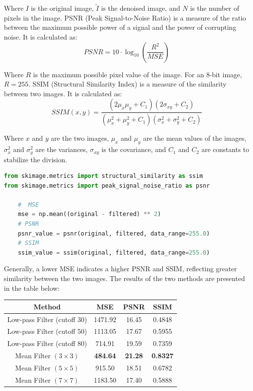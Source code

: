 \documentclass[12pt, a4paper, oneside]{ctexart}
\begin{document}
Where \(I\) is the original image, \(\tilde{I}\) is the denoised image, and \(N\) is the number of pixels in the image.	
PSNR (Peak Signal-to-Noise Ratio) is a measure of the ratio between the maximum possible power of a signal and the power of corrupting noise. It is calculated as:
\[PSNR = 10 \cdot \log_{10}\left(\frac{R^2}{MSE}\right)\]

Where \(R\) is the maximum possible pixel value of the image. For an 8-bit image, \(R = 255\).
SSIM (Structural Similarity Index) is a measure of the similarity between two images. It is calculated as:
\[SSIM(x, y) = \frac{(2\mu_x\mu_y + C_1)(2\sigma_{xy} + C_2)}{(\mu_x^2 + \mu_y^2 + C_1)(\sigma_x^2 + \sigma_y^2 + C_2)}\]

Where \(x\) and \(y\) are the two images, \(\mu_x\) and \(\mu_y\) are the mean values of the images, \(\sigma_x^2\) and \(\sigma_y^2\) are the variances, \(\sigma_{xy}\) is the covariance, and \(C_1\) and \(C_2\) are constants to stabilize the division.

\begin{lstlisting}[style=mystyle,language=Python]
from skimage.metrics import structural_similarity as ssim
from skimage.metrics import peak_signal_noise_ratio as psnr	

	#  MSE
	mse = np.mean((original - filtered) ** 2)
	# PSNR 
	psnr_value = psnr(original, filtered, data_range=255.0)
	# SSIM
    ssim_value = ssim(original, filtered, data_range=255.0)
\end{lstlisting}

Generally, a lower MSE indicates a higher PSNR and SSIM, reflecting greater similarity between the two images. The results of the two methods are presented in the table below:

\begin{table}[h]
	\centering
	\begin{tabular}{cccc}
		\toprule
		Method & MSE   & PSNR  & SSIM  \\ 
		\midrule
		Low-pass Filter (cutoff 30) & 1471.92 & 16.45 & 0.4848  \\ 
		Low-pass Filter (cutoff 50) & 1113.05 & 17.67 & 0.5955  \\ 
		Low-pass Filter (cutoff 80) & 714.91 & 19.59 & 0.7359  \\ 
		Mean Filter $(3\times3)$    & \textbf{484.64} & \textbf{21.28} & \textbf{0.8327}  \\ 
		Mean Filter $(5\times5)$    & 915.50 & 18.51 & 0.6782  \\ 
		Mean Filter $(7\times7)$    & 1183.50 & 17.40 & 0.5888  \\ 
		\bottomrule
	\end{tabular}
\end{table}
\end{document}
